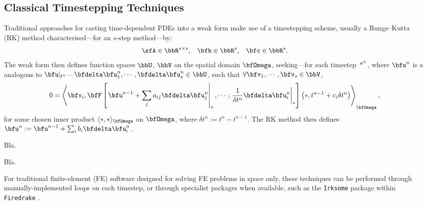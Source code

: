\subsection*{Classical Timestepping Techniques}

    Traditional approaches for casting time-dependent PDEs into a weak form make use of a timestepping scheme, usually a Runge–Kutta (RK) method characterised—for an $s$-step method—by:
    \begin{align}
        \sfA  \in  \bbR^{s \times s},  &&
        \bfb  \in  \bbR^{s},  &&
        \bfc  \in  \bbR^{s}.
    \end{align}
    The weak form then defines function spaces $\bbU$, $\bbV$ on the spatial domain $\bfOmega$, seeking—for each timestep $*^{n}$, where $\bfu^{n}$ is a analogous to $\bfu|_{t^{n}}$—$\bfdelta\bfu^{n}_{1}, \cdots, \bfdelta\bfu^{n}_{s}  \in  \bbU$, such that $\forall  \bfv_{1}, \cdots, \bfv_{s}  \in  \bbV$,
    \begin{equation}
        0  =  \left\langle\bfv_{i}, \bfF\left[\left.\bfu^{n - 1} + \sum_{j}a_{ij}\bfdelta\bfu^{n}_{j}\right|_{*}, \cdots; \left.\frac{1}{\delta t^{n}}\bfdelta\bfu^{n}_{i}\right|_{*}\right]\left(*, t^{n - 1} + c_{i}\delta t^{n}\right)\right\rangle_{\bfOmega},
    \end{equation}
    for some chosen inner product $\langle*, *\rangle_{\bfOmega}$ on $\bfOmega$, where $\delta t^{n}  :=  t^{n} - t^{n - 1}$. The RK method then defines $\bfu^{n}  :=  \bfu^{n - 1} + \sum_{i}b_{i}\bfdelta\bfu^{n}_{i}$.
    
    \line
    \begin{example}
        Bla.
    \end{example} 

    \begin{example}
        Bla.
    \end{example}
    \line
    
    For traditional finite-element (FE) software designed for solving FE problems in space only, these techniques can be performed through manually-implemented loops on each timestep, or through specialist packages when available, such as the \texttt{Irksome} package within \texttt{Firedrake} \BA{[Ref]}.

    